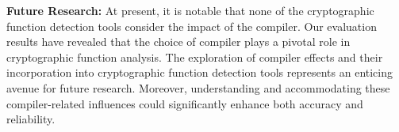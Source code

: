 \begin{takeaway}
\textbf{Future Research:} At present, it is notable that none of the cryptographic function detection tools consider the impact of the compiler. Our evaluation results have revealed that the choice of compiler plays a pivotal role in cryptographic function analysis.
        The exploration of compiler effects and their incorporation into cryptographic function detection tools represents an enticing avenue for future research.
        Moreover, understanding and accommodating these compiler-related influences could significantly enhance both accuracy and reliability.
\end{takeaway}



